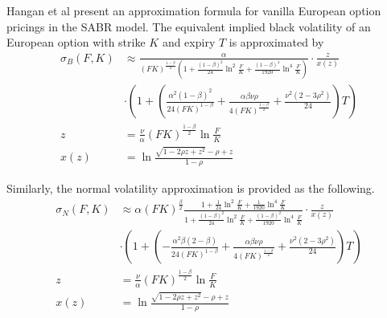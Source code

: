 \documentclass{article}
\begin{document}
Hangan et al \cite{Managing Smile Risk} present an approximation formula for vanilla European option pricings in the SABR model.
The equivalent implied black volatility of an European option with strike $ K $ and expiry $ T $ is approximated by
\begin{subequations} \label{SABR lognormal vol}
    \begin{align}
        \sigma_B\left(F, K\right) &\approx \frac{\alpha}{{\left(FK\right)}^{\frac{1 - \beta}{2}} \left(1 + \frac{{(1 - \beta)}^{2}}{24} \ln^{2}{\frac{F}{K}} + \frac{{(1 - \beta)}^{4}}{1920} \ln^{4}{\frac{F}{K}}\right)} \nonumber \cdot{\frac{z}{x\left(z\right)}} \nonumber \\
        & \cdot{\left(1 + \left(\frac{\alpha^2 {(1 - \beta)}^{2}}{24 {(F K)}^{1 - \beta}} + \frac{\alpha \beta \nu \rho}{4 {(F K)}^{\frac{1 - \beta}{2}}} + \frac{\nu^2 \left(2 - 3 \rho^2\right)}{24} \right) T \right)} \\
        z &= \frac{\nu}{\alpha} {(F K)} ^ {\frac{1 - \beta}{2}} \ln{\frac{F}{K}} \\
        x\left(z\right) &= \ln{\frac{\sqrt{1 - 2 \rho z + z^2} - \rho + z}{1 - \rho}}
    \end{align}
\end{subequations}

Similarly, the normal volatility approximation is provided as the following.
\begin{subequations} \label{SABR normal vol}
    \begin{align}
        \sigma_N\left(F, K\right) &\approx \alpha \left(F K\right)^{\frac{\beta}{2}} \frac{1 + \frac{1}{24} \ln^2{\frac{F}{K} + \frac{1}{1920} \ln^4{\frac{F}{K}}}}{1 + \frac{\left(1 - \beta\right)^2}{24} \ln^2{\frac{F}{K} + \frac{\left(1 - \beta\right)^2}{1920} \ln^4{\frac{F}{K}}}} \cdot{\frac{z}{x\left(z\right)}} \nonumber \\
        & \cdot{\left(1 + \left(-\frac{\alpha^2 \beta \left(2 - \beta\right)}{24 \left(F K\right)^{1 - \beta}} + \frac{\alpha \beta \nu \rho}{4 \left(F K\right)^{\frac{1 - \beta}{2}}} + \frac{\nu^2 \left(2 - 3 \rho^2\right)}{24}  \right) T\right)} \\
        z &= \frac{\nu}{\alpha} \left(F K\right)^{\frac{1 - \beta}{2}} \ln{\frac{F}{K}} \\
        x\left(z\right) &= \ln{\frac{\sqrt{1 - 2 \rho z + z^2} - \rho + z}{1 - \rho}}
    \end{align}
\end{subequations}
\end{document}
